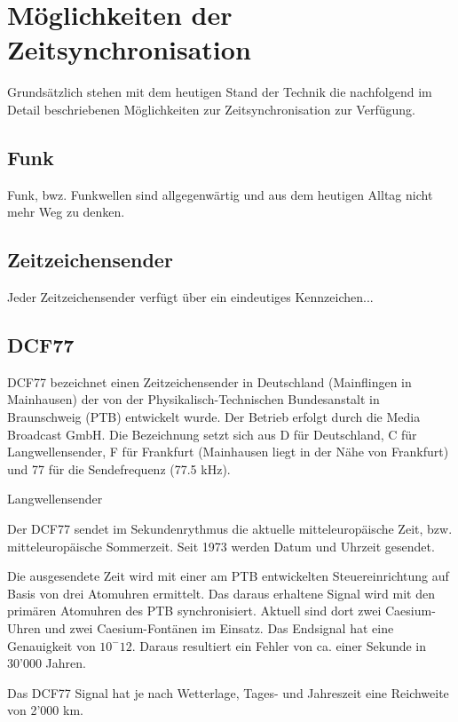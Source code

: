 \section{Möglichkeiten der Zeitsynchronisation}
Grundsätzlich stehen mit dem heutigen Stand der Technik die nachfolgend im Detail beschriebenen Möglichkeiten zur Zeitsynchronisation zur Verfügung.

\subsection{Funk}
Funk, bwz. Funkwellen sind allgegenwärtig und aus dem heutigen Alltag nicht mehr Weg zu denken.

\subsection{Zeitzeichensender}
Jeder Zeitzeichensender verfügt über ein eindeutiges Kennzeichen...

\subsection{DCF77}
DCF77 bezeichnet einen Zeitzeichensender in Deutschland (Mainflingen in Mainhausen) der von der Physikalisch-Technischen Bundesanstalt in Braunschweig (PTB) entwickelt wurde. Der Betrieb erfolgt durch die Media Broadcast GmbH. Die Bezeichnung setzt sich aus D für Deutschland, C für Langwellensender, F für Frankfurt (Mainhausen liegt in der Nähe von Frankfurt) und 77 für die Sendefrequenz (77.5 kHz).

Langwellensender

Der DCF77 sendet im Sekundenrythmus die aktuelle mitteleuropäische Zeit, bzw. mitteleuropäische Sommerzeit. Seit 1973 werden Datum und Uhrzeit gesendet.

Die ausgesendete Zeit wird mit einer am PTB entwickelten Steuereinrichtung auf Basis von drei Atomuhren ermittelt. Das daraus erhaltene Signal wird mit den primären Atomuhren des PTB synchronisiert. Aktuell sind dort zwei Caesium-Uhren und zwei Caesium-Fontänen im Einsatz. Das Endsignal hat eine Genauigkeit von $10^-12$. Daraus resultiert ein Fehler von ca. einer Sekunde in 30'000 Jahren.

Das DCF77 Signal hat je nach Wetterlage, Tages- und Jahreszeit eine Reichweite von 2'000 km.

